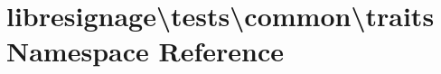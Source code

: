\hypertarget{namespacelibresignage_1_1tests_1_1common_1_1traits}{}\section{libresignage\textbackslash{}tests\textbackslash{}common\textbackslash{}traits Namespace Reference}
\label{namespacelibresignage_1_1tests_1_1common_1_1traits}
